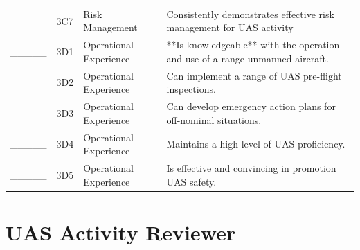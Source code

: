 \documentclass[
]{book}
\begin{document}
\begin{longtable}[t]{lll>{\raggedright\arraybackslash}p{25em}}
\_\_\_\_\_ & 3C7 & Risk Management & Consistently demonstrates effective risk management for UAS activity\\
\addlinespace
\_\_\_\_\_ & 3D1 & Operational Experience & **Is knowledgeable** with the operation and use of a range unmanned aircraft.\\
\_\_\_\_\_ & 3D2 & Operational Experience & Can implement a range of UAS pre-flight inspections.\\
\_\_\_\_\_ & 3D3 & Operational Experience & Can develop emergency action plans for off-nominal situations.\\
\_\_\_\_\_ & 3D4 & Operational Experience & Maintains a high level of UAS proficiency.\\
\_\_\_\_\_ & 3D5 & Operational Experience & Is effective and convincing in promotion UAS safety.\\
\bottomrule
\end{longtable}

\hypertarget{uas-activity-reviewer}{%
\section{UAS Activity Reviewer}\label{uas-activity-reviewer}}
\end{document}
